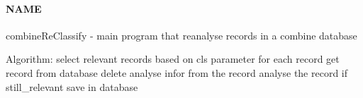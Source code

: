 \paragraph{NAME\label{NAME}}


combineReClassify - main program that reanalyse records in a combine database



Algorithm:
  select relevant records based on cls parameter
  for each record
     get record from database
     delete analyse infor from the record
     analyse the record
     if still\_relevant
        save in database

